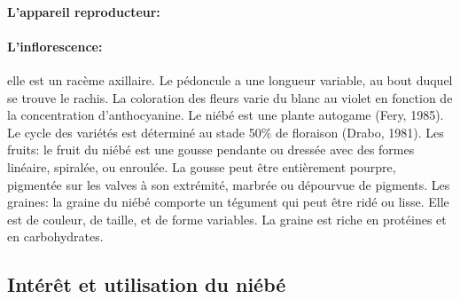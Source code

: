 \documentclass[a4paper,11pt]{article}
\begin{document}
 \paragraph{L’appareil reproducteur:}


\paragraph{L’inflorescence:} elle est un racème axillaire. Le pédoncule a une
longueur variable, au bout duquel se trouve le rachis. La coloration
des fleurs varie du blanc au violet en fonction de la concentration
d’anthocyanine. Le niébé est une plante autogame (Fery, 1985). Le cycle des
variétés est déterminé au stade 50\% de floraison (Drabo,
1981).  Les fruits: le fruit du niébé est une gousse pendante ou
dressée avec des formes linéaire, spiralée, ou enroulée. La gousse
peut être entièrement pourpre, pigmentée sur les valves à son
extrémité, marbrée ou dépourvue de pigments.  Les graines: la graine
du niébé comporte un tégument qui peut être ridé ou lisse. Elle est de
couleur, de taille, et de forme variables. La graine est riche en
protéines et en carbohydrates\cite{Doggett_1988}.

\subsection{Intérêt et utilisation du niébé}
\end{document}
